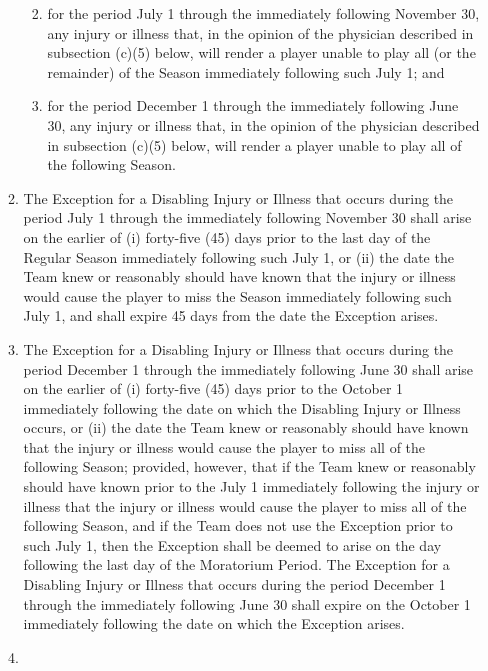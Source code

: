 \documentclass[
]{book}
\providecommand{\tightlist}{%
  \setlength{\itemsep}{0pt}\setlength{\parskip}{0pt}}
\begin{document}
\begin{enumerate}
\begin{enumerate}
    \begin{enumerate}
    \def\labelenumiii{(\roman{enumiii})}
    \tightlist
    \item
      for the period July 1 through the immediately following November 30, any injury or illness that, in the opinion of the physician described in subsection (c)(5) below, will render a player unable to play all (or the remainder) of the Season immediately following such July 1; and
    \item
      for the period December 1 through the immediately following June 30, any injury or illness that, in the opinion of the physician described in subsection (c)(5) below, will render a player unable to play all of the following Season.
    \end{enumerate}
  \item
    The Exception for a Disabling Injury or Illness that occurs during the period July 1 through the immediately following November 30 shall arise on the earlier of (i) forty-five (45) days prior to the last day of the Regular Season immediately following such July 1, or (ii) the date the Team knew or reasonably should have known that the injury or illness would cause the player to miss the Season immediately following such July 1, and shall expire 45 days from the date the Exception arises.
  \item
    The Exception for a Disabling Injury or Illness that occurs during the period December 1 through the immediately following June 30 shall arise on the earlier of (i) forty-five (45) days prior to the October 1 immediately following the date on which the Disabling Injury or Illness occurs, or (ii) the date the Team knew or reasonably should have known that the injury or illness would cause the player to miss all of the following Season; provided, however, that if the Team knew or reasonably should have known prior to the July 1 immediately following the injury or illness that the injury or illness would cause the player to miss all of the following Season, and if the Team does not use the Exception prior to such July 1, then the Exception shall be deemed to arise on the day following the last day of the Moratorium Period. The Exception for a Disabling Injury or Illness that occurs during the period December 1 through the immediately following June 30 shall expire on the October 1 immediately following the date on which the Exception arises.
  \item

\end{enumerate}
\end{enumerate}
\end{document}
